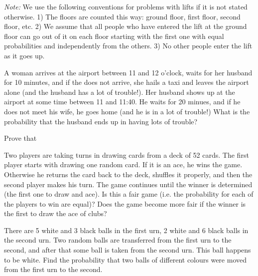 \documentclass[14pt]{exam}
\begin{document}
\begin{questions}
		\textit{Note:} We use the following conventions for problems with lifts if it is not stated otherwise. 1) The floors are counted this way: ground floor, first floor, second floor, etc. 2) We assume that all people who have entered the lift at the ground floor can go out of it on each floor starting with the first one with equal probabilities and independently from the others. 3) No other people enter the lift as it goes up.
		
		
		
		
		
		
		\question
		A woman arrives at the airport between 11 and 12 o'clock, waits for her husband for 10 minutes, and if the does not arrive, she hails a taxi and leaves the airport alone (and the husband has a lot of trouble!). Her husband shows up at the airport at some time between 11 and 11:40. He waits for 20 minues, and if he does not meet his wife, he goes home (and he is in a lot of trouble!) What is the probability that the husband ends up in having lots of trouble?




		
		\question
		\label{ex:lower_bounds}
		Prove that
		
		
		
		
		
		
		\question
		Two players are taking turns in drawing cards from a deck of 52 cards. The first player starts with drawing one random card. If it is an ace, he wins the game. Otherwise he returns the card back to the deck, shuffles it properly, and then the second player makes his turn. The game continues until the winner is determined (the first one to draw and ace). Is this a fair game (i.e. the probability for each of the players to win are equal)? Does the game become more fair if the winner is the first to draw the ace of clubs?
		




		
		\question
		There are 5 white and 3 black balls in the first urn, 2 white and 6 black balls in the second urn. Two random balls are transferred from the first urn to the second, and after that some ball is taken from the second urn. This ball happens to be white. Find the probability that two balls of different colours were moved from the first urn to the second.
		






\end{questions}
\end{document}
